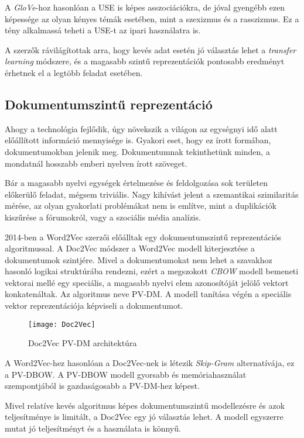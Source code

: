 A \textit{GloVe}-hoz hasonlóan a USE is képes asszociációkra, de jóval gyengébb ezen képessége az olyan kényes témák esetében, mint a szexizmus és a rasszizmus. Ez a tény alkalmassá teheti a USE-t az ipari használatra is.

A szerzők rávilágítottak arra, hogy kevés adat esetén jó választás lehet a \textit{transfer learning} módszere, és a magasabb szintű reprezentációk pontosabb eredményt érhetnek el a legtöbb feladat esetében.

\subsection{Dokumentumszintű reprezentáció}
Ahogy a technológia fejlődik, úgy növekszik a világon az egységnyi idő alatt előállított információ mennyisége is. Gyakori eset, hogy ez írott formában, dokumentumokban jelenik meg. Dokumentumnak tekinthetünk minden, a mondatnál hosszabb emberi nyelven írott szöveget.

Bár a magasabb nyelvi egységek értelmezése és feldolgozása sok területen előkerülő feladat, mégsem triviális. Nagy kihívást jelent a szemantikai szimilaritás mérése, az olyan gyakorlati problémákat nem is említve, mint a duplikációk kiszűrése a fórumokról, vagy a szociális média analízis.

2014-ben a Word2Vec szerzői előálltak egy dokumentumszintű reprezentációs algoritmussal. A Doc2Vec \cite{le2014distributed} módszer a Word2Vec modell kiterjesztése a dokumentumok szintjére. Mivel a dokumentumokat nem lehet a szavakhoz hasonló logikai struktúrába rendezni, ezért a megszokott \textit{CBOW} modell bemeneti vektorai mellé egy speciális, a magasabb nyelvi elem azonosítóját jelölő vektort konkatenáltak. Az algoritmus neve PV-DM. A modell tanítása végén a speciális vektor reprezentációja képviseli a dokumentumot.

\begin{figure}[H]
	\centering
	\texttt{[image: Doc2Vec]}
	\caption{Doc2Vec PV-DM architektúra}
\end{figure}

A Word2Vec-hez hasonlóan a Doc2Vec-nek is létezik \textit{Skip-Gram} alternatívája, ez a PV-DBOW. A PV-DBOW modell gyorsabb és memóriahasználat szempontjából is gazdaságosabb a PV-DM-hez képest.

Mivel relatíve kevés algoritmus képes dokumentumszintű modellezésre és azok teljesítménye is limitált, a Doc2Vec egy jó választás lehet. A modell egyszerre mutat jó teljesítményt és a használata is könnyű.

